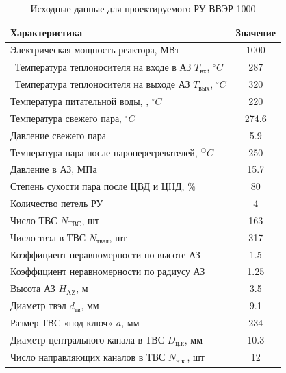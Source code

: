 \begin{table}[H]
	\caption{Исходные данные для проектируемого РУ ВВЭР-1000}
	\begin{center}
        \begin{tabular}{|l|c|}
        \toprule
         Характеристика & Значение \\ 
         \midrule
         \hline
         Электрическая мощность реактора, МВт & 1000 \\
         \hline\ 
         Температура теплоносителя на входе в АЗ $T_{\text{вх}}$, $^\circ C$  & 287 \\ 
         \hline\
         Температура теплоносителя на выходе АЗ $T_{\text{вых}}$, $^\circ C$ & 320 \\ 
         \hline
         Температура питательной воды, , $^\circ C$ & 220 \\ 
         \hline
         Температура свежего пара, $^\circ C$  &  274.6 \\ 
         \hline
         Давление свежего пара & 5.9 \\ 
         \hline
         Температура пара после пароперегревателей, $^○C$ & 250 \\ 
         \hline
         Давление в АЗ, МПа & 15.7 \\ 
         \hline
         Степень сухости пара после ЦВД и ЦНД, \% & 80 \\ 
         \hline
         Количество петель РУ & 4 \\ 
         \hline
         Число ТВС $N_{\text{ТВС}}$, шт  & 163 \\ 
         \hline
         Число твэл в ТВС $N_{\text{твэл}}$, шт & 317 \\ 
         \hline
         Коэффициент неравномерности по высоте АЗ  & 1.5 \\ 
         \hline
         Коэффициент неравномерности по радиусу АЗ & 1.25 \\ 
         \hline
         Высота АЗ $H_{\text{AZ}}$, м & 3.5 \\ 
         \hline
         Диаметр твэл $d_{\text{тв}}$, мм & 9.1 \\ 
         \hline
         Размер ТВС «под ключ» $a$, мм & 234 \\ 
         \hline
         Диаметр центрального канала в ТВС $D_{\text{ц.к}}$, мм & 10.3 \\ 
         \hline
         Число направляющих каналов в ТВС $N_{\text{н.к.}}$, шт & 12 \\ 

\end{tabular}
\end{center}
\end{table}
